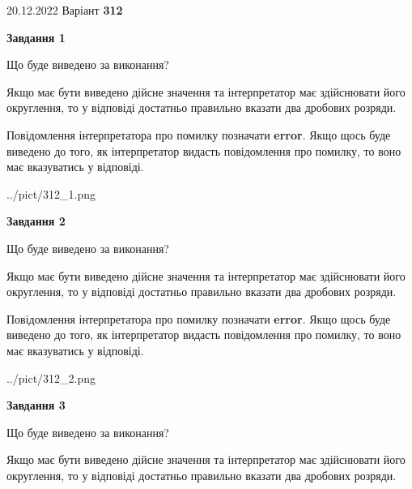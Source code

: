 \documentclass[12pt, ukrainian]{article}
\begin{document}
{20.12.2022 Варіант \No \textbf { 312 }\par}
{
\begin {Large}

{\begin {center}\textbf{Завдання 1}\end {center}}\par
Що буде виведено за виконання? \par

Якщо має бути виведено дійсне значення та інтерпретатор має здійснювати його округлення, 
то у відповіді достатньо правильно вказати два дробових розряди.

Повідомлення інтерпретатора про помилку позначати \textbf{error}.
Якщо щось буде виведено до того, як інтерпретатор видасть повідомлення про помилку, 
то воно має вказуватись у відповіді. \par

\begin{center}
	{../pict/312_1.png}
\end{center}
\newpage

{\begin {center}\textbf{Завдання 2}\end {center}}\par
Що буде виведено за виконання? \par

Якщо має бути виведено дійсне значення та інтерпретатор має здійснювати його округлення, 
то у відповіді достатньо правильно вказати два дробових розряди.

Повідомлення інтерпретатора про помилку позначати \textbf{error}.
Якщо щось буде виведено до того, як інтерпретатор видасть повідомлення про помилку, 
то воно має вказуватись у відповіді. \par

\begin{center}
	{../pict/312_2.png}
\end{center}
\newpage

{\begin {center}\textbf{Завдання 3}\end {center}}\par
Що буде виведено за виконання? \par

Якщо має бути виведено дійсне значення та інтерпретатор має здійснювати його округлення, 
то у відповіді достатньо правильно вказати два дробових розряди.


\end{Large}}
\end{document}
